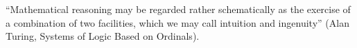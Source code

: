 
\begin{epigrafe}
    \vspace*{\fill}
    \itshape
    \begin{flushright}

        ``Mathematical reasoning may be regarded rather schematically as the exercise of a combination of two facilities, which we may call intuition and ingenuity'' (Alan Turing, Systems of Logic Based on Ordinals).

    \end{flushright}
\end{epigrafe}

